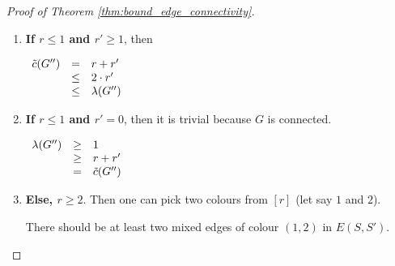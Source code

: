 \begin{proof}[Proof of Theorem \ref{thm:bound_edge_connectivity}]
\begin{enumerate}
            \begin{enumerate}
                \item 
                    \textbf{If $r \leq 1$ and $r' \geq 1$}, then 
                    
                    \begin{center}
                        $\begin{array}{l c l}
                            \Tilde{c}(G'')  & =    & r + r' \\
                                            & \leq & 2 \cdot r' \\
                                            & \leq & \lambda(G'')
                        \end{array}$
                    \end{center}
                    
                \item 
                    \textbf{If $r \leq 1$ and $r' = 0$}, then it is trivial because $G$ is connected.
                    
                    \begin{center}
                        $\begin{array}{lcl}
                            \lambda(G'')  & \geq & 1 \\
                                          & \geq & r + r' \\
                                          & =    & \Tilde{c}(G'')
                        \end{array}$
                    \end{center}
                    
                \item
                    \textbf{Else, $r \geq 2$}.
                    Then one can pick two colours from $[r]$ (let say $1$ and $2$).
                    
                    \begin{claim}
                        There should be at least two mixed edges of colour $(1, 2)$ in $E(S, S')$.
                    \end{claim}
                    

\end{enumerate}
\end{enumerate}
\end{proof}
